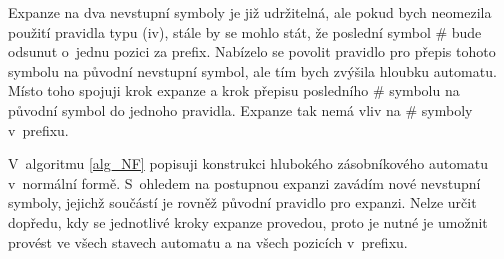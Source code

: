 Expanze na dva nevstupní symboly je již udržitelná, ale pokud bych neomezila použití pravidla typu (iv), stále by se mohlo stát, že poslední symbol $\#$ bude odsunut o~jednu pozici za prefix. Nabízelo se povolit pravidlo pro přepis tohoto symbolu na původní nevstupní symbol, ale tím bych zvýšila hloubku automatu. Místo toho spojuji krok expanze a krok přepisu posledního $\#$ symbolu na původní symbol do jednoho pravidla. Expanze tak nemá vliv na $\#$ symboly v~prefixu.

V~algoritmu \ref{alg_NF} popisuji konstrukci hlubokého zásobníkového automatu v~normální formě. S~ohledem na postupnou expanzi zavádím nové nevstupní symboly, jejichž součástí je rovněž původní pravidlo pro expanzi. Nelze určit dopředu, kdy se jednotlivé kroky expanze provedou, proto je nutné je umožnit provést ve všech stavech automatu a na všech pozicích v~prefixu. 

